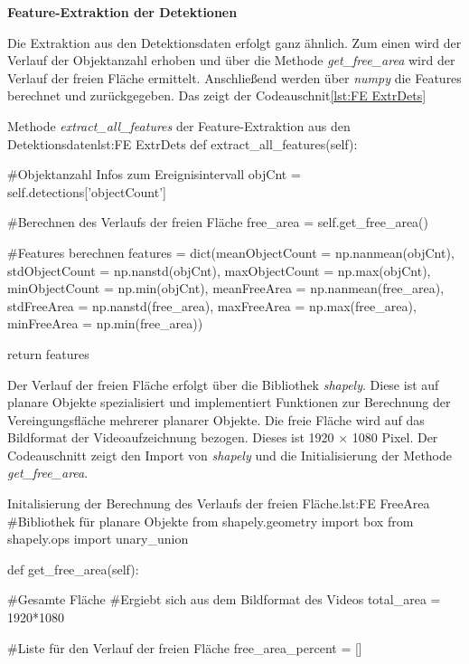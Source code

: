 \dubpar
\textbf{Feature-Extraktion der Detektionen}\par

Die Extraktion aus den Detektionsdaten erfolgt ganz ähnlich. Zum einen wird der Verlauf der Objektanzahl erhoben und über die Methode \textit{get\_free\_area} wird der Verlauf der freien Fläche ermittelt. Anschließend werden über \textit{numpy} die Features berechnet und zurückgegeben. Das zeigt der Codeauschnit\ref{lst:FE ExtrDets}

\begin{pythoncode}{Methode \textit{extract\_all\_features} der Feature-Extraktion aus den Detektionsdaten}{lst:FE ExtrDets}
def extract_all_features(self):

    #Objektanzahl Infos zum Ereignisintervall
    objCnt = self.detections['objectCount']

    #Berechnen des Verlaufs der freien Fläche
    free_area = self.get_free_area()

    #Features berechnen
    features = dict(meanObjectCount = np.nanmean(objCnt),
                    stdObjectCount = np.nanstd(objCnt),
                    maxObjectCount = np.max(objCnt),
                    minObjectCount = np.min(objCnt),
                    meanFreeArea = np.nanmean(free_area),
                    stdFreeArea = np.nanstd(free_area),
                    maxFreeArea = np.max(free_area),
                    minFreeArea = np.min(free_area))

    return features

\end{pythoncode}

Der Verlauf der freien Fläche erfolgt über die Bibliothek \textit{shapely}. Diese ist auf planare Objekte spezialisiert und implementiert Funktionen zur Berechnung der Vereingungsfläche mehrerer planarer Objekte. Die freie Fläche wird auf das Bildformat der Videoaufzeichnung bezogen. Dieses ist 1920 × 1080 Pixel.  Der Codeauschnitt zeigt den Import von \textit{shapely} und die Initialisierung der Methode \textit{get\_free\_area}. 

\begin{pythoncode}{Initalisierung der Berechnung des Verlaufs der freien Fläche.}{lst:FE FreeArea}
#Bibliothek für planare Objekte
from shapely.geometry import box
from shapely.ops import unary_union

def get_free_area(self):  
    
    #Gesamte Fläche 
    #Ergiebt sich aus dem Bildformat des Videos
    total_area = 1920*1080

    #Liste für den Verlauf der freien Fläche
    free_area_percent = []

\end{pythoncode}

